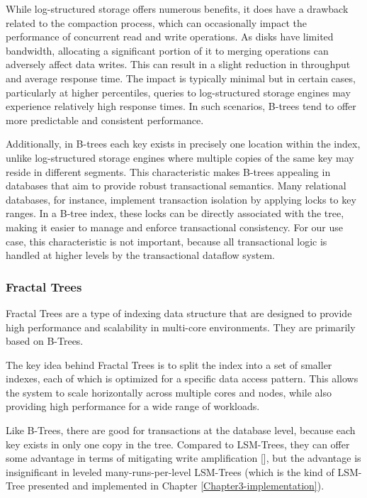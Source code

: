 While log-structured storage offers numerous benefits, it does have a drawback related to the compaction process, which can occasionally impact the performance of concurrent read and write operations. As disks have limited bandwidth, allocating a significant portion of it to merging operations can adversely affect data writes. This can result in a slight reduction in throughput and average response time. The impact is typically minimal but in certain cases, particularly at higher percentiles, queries to log-structured storage engines may experience relatively high response times. In such scenarios, B-trees tend to offer more predictable and consistent performance.

Additionally, in B-trees each key exists in precisely one location within the index, unlike log-structured storage engines where multiple copies of the same key may reside in different segments. This characteristic makes B-trees appealing in databases that aim to provide robust transactional semantics. Many relational databases, for instance, implement transaction isolation by applying locks to key ranges. In a B-tree index, these locks can be directly associated with the tree, making it easier to manage and enforce transactional consistency. For our use case, this characteristic is not important, because all transactional logic is handled at higher levels by the transactional dataflow system.

\subsubsection{Fractal Trees}

Fractal Trees are a type of indexing data structure that are designed to provide high performance and scalability in multi-core environments. They are primarily based on B-Trees.

The key idea behind Fractal Trees is to split the index into a set of smaller indexes, each of which is optimized for a specific data access pattern. This allows the system to scale horizontally across multiple cores and nodes, while also providing high performance for a wide range of workloads.

Like B-Trees, there are good for transactions at the database level, because each key exists in only one copy in the tree. Compared to LSM-Trees, they can offer some advantage in terms of mitigating write amplification [\cite{fractal-trees}], but the advantage is insignificant in leveled many-runs-per-level LSM-Trees (which is the kind of LSM-Tree presented and implemented in Chapter \ref{Chapter3-implementation}).

